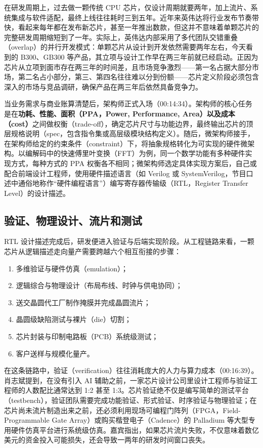\documentclass[UTF8,a4paper,11pt,fontset=fandol]{ctexart}
\begin{document}
在研发周期上，过去做一颗传统 CPU 芯片，仅设计周期就要两年，加上流片、系统集成与软件适配，最终上线往往耗时三到五年。近年来英伟达将行业发布节奏带快，看起来每年都在发布新芯片，甚至一年推出数款，但这并不意味着单颗芯片的完整研发周期缩短到了一年。实际上，英伟达内部采用了多代团队交错重叠（overlap）的并行开发模式：单颗芯片从设计到开发依然需要两年左右，今天看到的 B300、GB300 等产品，其立项与设计工作早在两三年前就已经启动。正因为芯片从立项到面市存在两三年的时间差，且市场竞争激烈——第一名占据大部分市场，第二名占小部分，第三、第四名往往难以分到份额——芯片定义阶段必须包含深入的市场与竞品调研，确保产品在两三年后依然具备竞争力。

当业务需求与商业账算清楚后，架构师正式入场（00:14:34）。架构师的核心任务是在\textbf{功耗、性能、面积（PPA，Power, Performance, Area）以及成本（cost）}之间做权衡（trade-off），确定芯片尺寸与功能边界，最终输出芯片的顶层规格说明（spec，包含指令集或高层级模块结构定义）。随后，微架构师接手，在架构师给定的约束条件（constraint）下，将抽象规格转化为可实现的硬件微架构。以编解码中的快速傅里叶变换（FFT）为例，同一个数学功能有多种硬件实现方式，每种方式的 PPA 权衡各不相同；微架构师选定具体实现方案后，自己或配合前端设计工程师，使用硬件描述语言（如 Verilog 或 SystemVerilog，节目口述中通俗地称作“硬件编程语言”）编写寄存器传输级（RTL，Register Transfer Level）的设计描述。

\subsection{验证、物理设计、流片和测试}
RTL 设计描述完成后，研发便进入验证与后端实现阶段。从工程链路来看，一颗芯片从逻辑描述走向量产需要跨越六个相互衔接的步骤：
\begin{enumerate}
\item 多维验证与硬件仿真（emulation）；
\item 逻辑综合与物理设计（布局布线、时钟与供电协同）；
\item 送交晶圆代工厂制作掩膜并完成晶圆流片；
\item 晶圆级缺陷测试与裸片（die）切割；
\item 芯片封装与印制电路板（PCB）系统级测试；
\item 客户送样与规模化量产。
\end{enumerate}

在这条链路中，验证（verification）往往消耗庞大的人力与算力成本（00:16:39）。肖志斌提到，在没有引入 AI 辅助之前，一家芯片设计公司里设计工程师与验证工程师的人数配比通常达到 1:2 甚至 1:3。芯片验证绝不仅是编写简单的测试平台（testbench），验证团队需要完成功能验证、形式验证、时序验证与物理验证；在芯片尚未流片制造出来之前，还必须利用现场可编程门阵列（FPGA，Field-Programmable Gate Array）或购买楷登电子（Cadence）的 Palladium 等大型专用硬件仿真平台进行系统级仿真。嘉宾指出，如果芯片流片失败，不仅意味着数亿美元的资金投入可能损失，还会导致一两年的研发时间窗口丧失。
\end{document}
